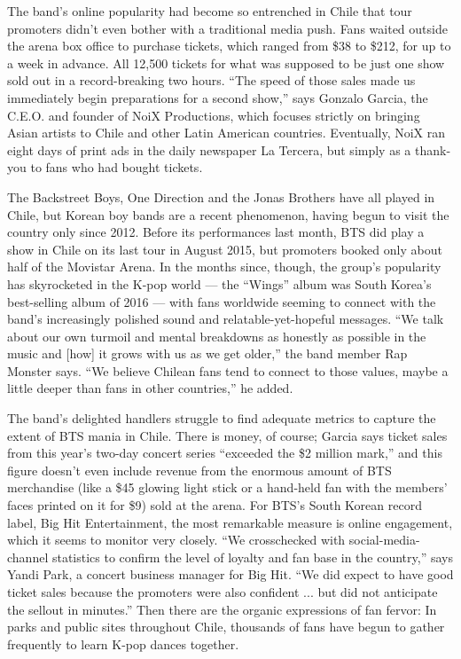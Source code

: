 The band's online popularity had become so entrenched in Chile that tour
promoters didn't even bother with a traditional media push. Fans waited
outside the arena box office to purchase tickets, which ranged from \$38
to \$212, for up to a week in advance. All 12,500 tickets for what was
supposed to be just one show sold out in a record-breaking two hours.
``The speed of those sales made us immediately begin preparations for a
second show,'' says Gonzalo Garcia, the C.E.O. and founder of NoiX
Productions, which focuses strictly on bringing Asian artists to Chile
and other Latin American countries. Eventually, NoiX ran eight days of
print ads in the daily newspaper La Tercera, but simply as a thank-you
to fans who had bought tickets.

The Backstreet Boys, One Direction and the Jonas Brothers have all
played in Chile, but Korean boy bands are a recent phenomenon, having
begun to visit the country only since 2012. Before its performances last
month, BTS did play a show in Chile on its last tour in August 2015, but
promoters booked only about half of the Movistar Arena. In the months
since, though, the group's popularity has skyrocketed in the K-pop world
--- the ``Wings'' album was South Korea's best-selling album of 2016 ---
with fans worldwide seeming to connect with the band's increasingly
polished sound and relatable-yet-hopeful messages. ``We talk about our
own turmoil and mental breakdowns as honestly as possible in the music
and {[}how{]} it grows with us as we get older,'' the band member Rap
Monster says. ``We believe Chilean fans tend to connect to those values,
maybe a little deeper than fans in other countries,'' he added.

The band's delighted handlers struggle to find adequate metrics to
capture the extent of BTS mania in Chile. There is money, of course;
Garcia says ticket sales from this year's two-day concert series
``exceeded the \$2 million mark,'' and this figure doesn't even include
revenue from the enormous amount of BTS merchandise (like a \$45 glowing
light stick or a hand-held fan with the members' faces printed on it for
\$9) sold at the arena. For BTS's South Korean record label, Big Hit
Entertainment, the most remarkable measure is online engagement, which
it seems to monitor very closely. ``We crosschecked with
social-media-channel statistics to confirm the level of loyalty and fan
base in the country,'' says Yandi Park, a concert business manager for
Big Hit. ``We did expect to have good ticket sales because the promoters
were also confident ... but did not anticipate the sellout in minutes.''
Then there are the organic expressions of fan fervor: In parks and
public sites throughout Chile, thousands of fans have begun to gather
frequently to learn K-pop dances together.

